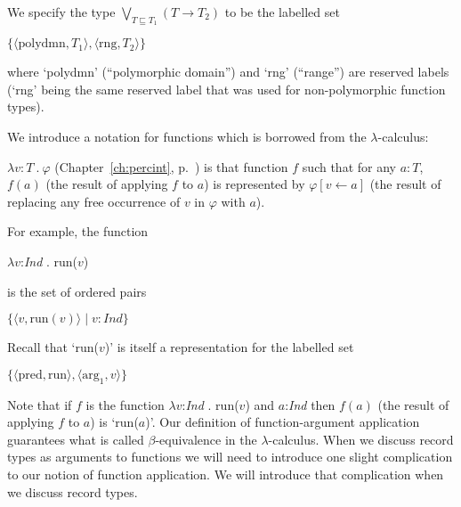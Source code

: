 We
specify the type $\displaystyle{\bigvee_{T\sqsubseteq T_1}}(T\rightarrow T_2)$   to be the labelled set

$\{\langle\mathrm{polydmn},T_1\rangle,\langle\mathrm{rng},T_2\rangle\}$

where `polydmn' (``polymorphic domain'') and `rng' (``range'') are
reserved labels (`rng' being the same reserved label that was used for
non-polymorphic function types).






We introduce a notation for functions which is borrowed from the
$\lambda$-calculus:

$\lambda v\!:\!T\ .\ \varphi$ (Chapter~\ref{ch:percint},
p.~\pageref{ex:fun-notation}) is that function $f$ such that for any
$a:T$, $f(a)$ (the result of applying $f$ to $a$) is represented by
$\varphi[v\leftarrow a]$ (the result of replacing any free occurrence
of $v$ in $\varphi$ with $a$).





For
example, the function

$\lambda v$:\textit{Ind} . run($v$)

is the set of ordered pairs

$\{\langle v,\mathrm{run}(v)\rangle\mid v:\mathit{Ind}\}$

Recall that `run($v$)' is itself a representation for the labelled
set

$\{\langle \mathrm{pred},\mathrm{run}\rangle, \langle
\mathrm{arg}_1,v\rangle\}$

Note that if $f$ is the function $\lambda v$:\textit{Ind} . run($v$)
and $a$:\textit{Ind} then $f(a)$ (the result of applying $f$ to $a$)
is `run($a$)'.  Our definition of function-argument application
guarantees what is called $\beta$-equivalence in the
$\lambda$-calculus.  When we discuss record types as arguments to
functions we will need to introduce one slight complication to our
notion of function application.  We will introduce that complication
when we discuss record types.




